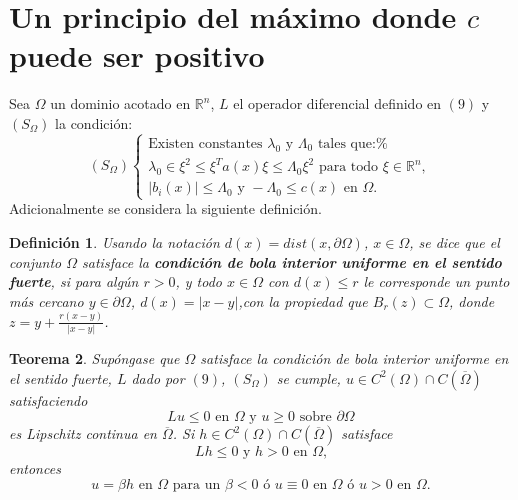 \documentclass{article}
\newtheorem{theorem}{Teorema}
\newtheorem{definition}[theorem]{Definici\'{o}n}
\begin{document}
\section{Un principio del m\'{a}ximo donde $c$ puede ser positivo}

Sea $\Omega $ un dominio acotado en $\mathbb{R}^{n}$, $L$ el operador
diferencial definido en $\left( 9\right) $ y $\left( S_{\Omega }\right) $ la
condici\'{o}n: 
\begin{equation*}
\left( S_{\Omega }\right) \left\{ 
\begin{array}{c}
\text{Existen constantes }\lambda _{0}\text{ y }\Lambda _{0}\text{ tales que:%
} \\ 
\lambda _{0}\in \xi ^{2}\leq \xi ^{T}a\left( x\right) \xi \leq \Lambda
_{0}\xi ^{2}\text{ para todo }\xi \in \mathbb{R}^{n}, \\ 
\left\vert b_{i}\left( x\right) \right\vert \leq \Lambda _{0}\text{ y }%
-\Lambda _{0}\leq c\left( x\right) \text{ en }\Omega \text{.}
\end{array}
\right.
\end{equation*}
Adicionalmente se considera la siguiente definici\'{o}n.

\begin{definition}
Usando la notaci\'{o}n $d\left( x\right) =dist\left( x,\partial \Omega
\right) $, $x\in \Omega $, se dice que el conjunto $\Omega $ satisface la 
\textbf{condici\'{o}n de bola interior uniforme en el sentido fuerte}, si
para alg\'{u}n $r>0$, y todo $x\in \Omega $ con $d\left( x\right) \leq r$ le
corresponde un punto m\'{a}s cercano $y\in \partial \Omega $, $d\left(
x\right) =\left\vert x-y\right\vert $,con la propiedad que $B_{r}\left(
z\right) \subset \Omega $, donde $z=y+\frac{r\left( x-y\right) }{\left\vert
x-y\right\vert }$.
\end{definition}

\begin{theorem}
Sup\'{o}ngase que $\Omega $ satisface la condici\'{o}n de bola interior
uniforme en el sentido fuerte, $L$ dado por $\left( 9\right) $, $\left(
S_{\Omega }\right) $ se cumple, $u\in C^{2}\left( \Omega \right) \cap
C\left( \overline{\Omega }\right) $ satisfaciendo 
\begin{equation*}
Lu\leq 0\text{ \ en }\Omega \text{ \ y }u\geq 0\text{ \ sobre }\partial
\Omega
\end{equation*}
es Lipschitz continua en $\overline{\Omega }$. Si $h\in C^{2}\left( \Omega
\right) \cap C\left( \overline{\Omega }\right) $ satisface 
\begin{equation*}
Lh\leq 0\text{ \ y \ }h>0\text{ en }\Omega \text{,}
\end{equation*}
entonces 
\begin{equation*}
u=\beta h\text{ \ en }\Omega \text{ para un }\beta <0\text{ \ \'{o} \ }%
u\equiv 0\text{ \ en }\Omega \text{ \ \'{o} }u>0\text{ \ en }\Omega \text{.}
\end{equation*}
\end{theorem}
\end{document}
